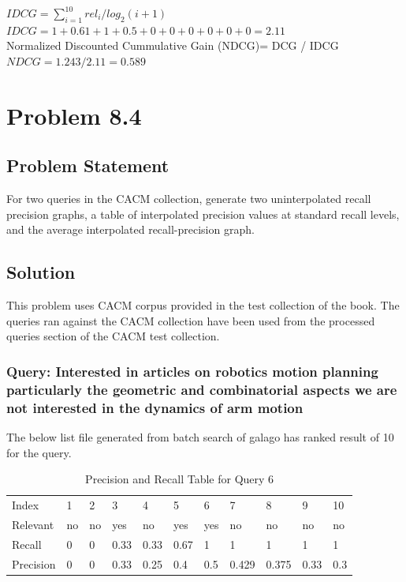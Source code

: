 \documentclass[12pt]{report}
\begin{document}
$IDCG = \sum\limits_{i=1}^{10} rel_i / log_2(i + 1)$ \\
$IDCG = 1 + 0.61 + 1 + 0.5 + 0 + 0 + 0 + 0 + 0 + 0 =  2.11$\\
Normalized Discounted Cummulative Gain (NDCG)=  DCG / IDCG\\
$NDCG = 1.243 / 2.11 = 0.589$

\chapter{Problem 8.4}
\section{Problem Statement}
For two queries in the CACM collection, generate two uninterpolated recall precision graphs, a table of interpolated precision values at standard recall levels, and the average interpolated recall-precision graph.
\section{Solution}
This problem uses CACM corpus provided in the test collection of the book. The queries ran against the CACM collection have been used from the processed queries section of the CACM test collection.\\
\subsection{Query: Interested in articles on robotics motion planning particularly the geometric and combinatorial aspects we are not interested in the dynamics of arm motion}

The below list file generated from batch search of galago has ranked result of 10 for the query.


\begin{table}[]
\centering
\caption{Precision and Recall Table for Query 6}
\label{my-label}
\begin{tabular}{lllllllllll}
Index     & 1    & 2    & 3    & 4   & 5   & 6    & 7     & 8     & 9    & 10  \\
Relevant  & no  & no   & yes   & no & yes  & yes   & no   & no    & no   & no \\
Recall    & 0 & 0 & 0.33 & 0.33 & 0.67 & 1  & 1  & 1  & 1 & 1   \\
Precision & 0  & 0  & 0.33 & 0.25 & 0.4 & 0.5 & 0.429 & 0.375 & 0.33 & 0.3
\end{tabular}
\end{table}
\end{document}
